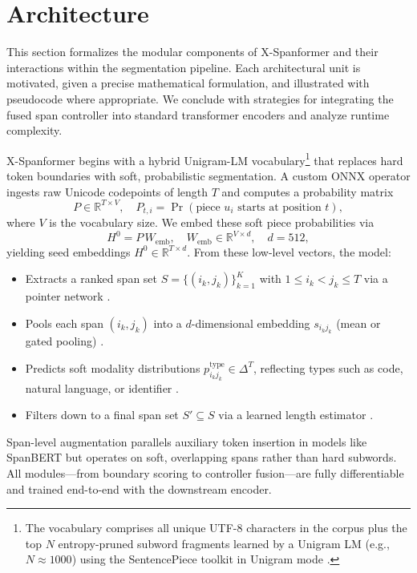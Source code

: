 \section{Architecture}

This section formalizes the modular components of X-Spanformer and their interactions within the segmentation pipeline. Each architectural unit is motivated, given a precise mathematical formulation, and illustrated with pseudocode where appropriate. We conclude with strategies for integrating the fused span controller into standard transformer encoders and analyze runtime complexity.

X-Spanformer begins with a hybrid Unigram-LM vocabulary\footnote{\label{fn:unigram}The vocabulary comprises all unique UTF-8 characters in the corpus plus the top \(N\) entropy-pruned subword fragments learned by a Unigram LM (e.g., \(N\approx1000\)) using the SentencePiece toolkit in Unigram mode \cite{kudo2018sentencepiece,rawson2025streammix}.} that replaces hard token boundaries with soft, probabilistic segmentation. A custom ONNX operator ingests raw Unicode codepoints of length \(T\) and computes a probability matrix  
\[
P \in \mathbb{R}^{T \times V}, 
\quad
P_{t,i} = \Pr(\text{piece }u_i \text{ starts at position }t),
\]
where \(V\) is the vocabulary size. We embed these soft piece probabilities via  
\[
H^0 = P\,W_{\mathrm{emb}}, 
\quad
W_{\mathrm{emb}}\in\mathbb{R}^{V\times d},\quad d=512,
\]
yielding seed embeddings \(H^0\in\mathbb{R}^{T\times d}\). From these low-level vectors, the model:

\begin{itemize}
	\item Extracts a ranked span set \(S=\{(i_k,j_k)\}_{k=1}^K\) with \(1\le i_k<j_k\le T\) via a pointer network \cite{vinyals2015pointer}.
	\item Pools each span \((i_k,j_k)\) into a \(d\)-dimensional embedding \(s_{i_k j_k}\) (mean or gated pooling) \cite{tay2021charformer}.
	\item Predicts soft modality distributions \(p^\mathrm{type}_{i_k j_k}\in\Delta^T\), reflecting types such as code, natural language, or identifier \cite{lin2021codemix,li2021prefix}.
	\item Filters down to a final span set \(S'\subseteq S\) via a learned length estimator \cite{cheng2021masked}.
\end{itemize}

Span-level augmentation parallels auxiliary token insertion in models like SpanBERT \cite{joshi2020spanbert} but operates on soft, overlapping spans rather than hard subwords. All modules—from boundary scoring to controller fusion—are fully differentiable and trained end-to-end with the downstream encoder.








